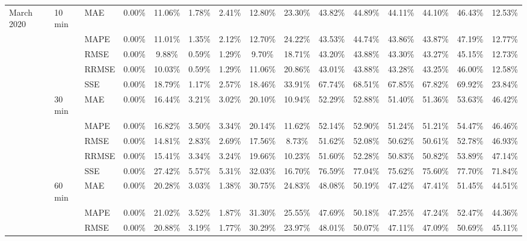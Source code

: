 {\begin{longtable}[htb!]{lllcccccccccccc}
{March 2020} & {10 min} & {MAE} & {0.00\%} & {11.06\%} & {1.78\%} & {2.41\%} & {12.80\%} & {23.30\%} & {43.82\%} & {44.89\%} & {44.11\%} & {44.10\%} & {46.43\%} & {12.53\%} \\
{} & {} & {MAPE} & {0.00\%} & {11.01\%} & {1.35\%} & {2.12\%} & {12.70\%} & {24.22\%} & {43.53\%} & {44.74\%} & {43.86\%} & {43.87\%} & {47.19\%} & {12.77\%} \\
{} & {} & {RMSE} & {0.00\%} & {9.88\%} & {0.59\%} & {1.29\%} & {9.70\%} & {18.71\%} & {43.20\%} & {43.88\%} & {43.30\%} & {43.27\%} & {45.15\%} & {12.73\%} \\
{} & {} & {RRMSE} & {0.00\%} & {10.03\%} & {0.59\%} & {1.29\%} & {11.06\%} & {20.86\%} & {43.01\%} & {43.88\%} & {43.28\%} & {43.25\%} & {46.00\%} & {12.58\%} \\
& {} & {SSE} & {0.00\%} & {18.79\%} & {1.17\%} & {2.57\%} & {18.46\%} & {33.91\%} & {67.74\%} & {68.51\%} & {67.85\%} & {67.82\%} & {69.92\%} & {23.84\%} \\
{} & {30 min} & {MAE} & {0.00\%} & {16.44\%} & {3.21\%} & {3.02\%} & {20.10\%} & {10.94\%} & {52.29\%} & {52.88\%} & {51.40\%} & {51.36\%} & {53.63\%} & {46.42\%} \\
{} & {} & {MAPE} & {0.00\%} & {16.82\%} & {3.50\%} & {3.34\%} & {20.14\%} & {11.62\%} & {52.14\%} & {52.90\%} & {51.24\%} & {51.21\%} & {54.47\%} & {46.46\%} \\
{} & {} & {RMSE} & {0.00\%} & {14.81\%} & {2.83\%} & {2.69\%} & {17.56\%} & {8.73\%} & {51.62\%} & {52.08\%} & {50.62\%} & {50.61\%} & {52.78\%} & {46.93\%} \\
{} & {} & {RRMSE} & {0.00\%} & {15.41\%} & {3.34\%} & {3.24\%} & {19.66\%} & {10.23\%} & {51.60\%} & {52.28\%} & {50.83\%} & {50.82\%} & {53.89\%} & {47.14\%} \\
& {} & {SSE} & {0.00\%} & {27.42\%} & {5.57\%} & {5.31\%} & {32.03\%} & {16.70\%} & {76.59\%} & {77.04\%} & {75.62\%} & {75.60\%} & {77.70\%} & {71.84\%} \\
{} & {60 min} & {MAE} & {0.00\%} & {20.28\%} & {3.03\%} & {1.38\%} & {30.75\%} & {24.83\%} & {48.08\%} & {50.19\%} & {47.42\%} & {47.41\%} & {51.45\%} & {44.51\%} \\
{} & {} & {MAPE} & {0.00\%} & {21.02\%} & {3.52\%} & {1.87\%} & {31.30\%} & {25.55\%} & {47.69\%} & {50.18\%} & {47.25\%} & {47.24\%} & {52.47\%} & {44.36\%} \\
{} & {} & {RMSE} & {0.00\%} & {20.88\%} & {3.19\%} & {1.77\%} & {30.29\%} & {23.97\%} & {48.01\%} & {50.07\%} & {47.11\%} & {47.09\%} & {50.69\%} & {45.11\%} \\

\end{longtable}}
